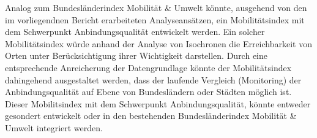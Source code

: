 Analog zum Bundesländerindex Mobilität \& Umwelt könnte, ausgehend von den im vorliegendnen Bericht erarbeiteten Analyseansätzen, ein Mobilitätsindex mit dem Schwerpunkt Anbindungsqualität entwickelt werden.  Ein solcher Mobilitätsindex würde anhand der Analyse von Isochronen die Erreichbarkeit von Orten unter Berücksichtigung ihrer Wichtigkeit darstellen. Durch eine entsprechende Anreicherung der Datengrundlage könnte der Mobilitätsindex dahingehend ausgestaltet werden, dass der laufende Vergleich (Monitoring) der Anbindungsqualität auf Ebene von Bundesländern oder Städten möglich ist. Dieser Mobilitsindex mit dem Schwerpunkt Anbindungsqualität, könnte entweder gesondert entwickelt oder in den bestehenden Bundesländerindex Mobilität \& Umwelt integriert werden.





